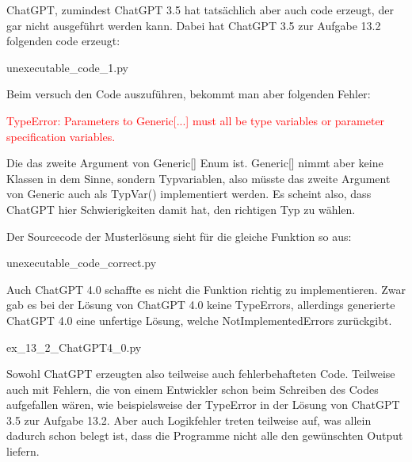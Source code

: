 \documentclass[class=scrbook, crop=false]{standalone}
\begin{document}
    ChatGPT, zumindest ChatGPT 3.5 hat tatsächlich aber auch code erzeugt, der gar nicht ausgeführt werden kann.
    Dabei hat ChatGPT 3.5 zur Aufgabe 13.2 folgenden code erzeugt:
    
    {unexecutable_code_1.py}

    Beim versuch den Code auszuführen, bekommt man aber folgenden Fehler:

    \textcolor{red} {
        TypeError: Parameters to Generic[...] must all be type variables or parameter specification variables.
    }

    Die das zweite Argument von Generic[] Enum ist.
    Generic[] nimmt aber keine Klassen in dem Sinne, sondern Typvariablen, also müsste das zweite Argument von Generic auch als TypVar() implementiert werden.
    Es scheint also, dass ChatGPT hier Schwierigkeiten damit hat, den richtigen Typ zu wählen.

    Der Sourcecode der Musterlösung sieht für die gleiche Funktion so aus:
    
    {unexecutable_code_correct.py}

    Auch ChatGPT 4.0 schaffte es nicht die Funktion richtig zu implementieren.
    Zwar gab es bei der Lösung von ChatGPT 4.0 keine TypeErrors, allerdings generierte ChatGPT 4.0 eine unfertige Lösung, welche
    NotImplementedErrors zurückgibt.
    
    {ex_13_2_ChatGPT4_0.py}

    Sowohl ChatGPT erzeugten also teilweise auch fehlerbehafteten Code.
    Teilweise auch mit Fehlern, die von einem Entwickler schon beim Schreiben des Codes aufgefallen wären, wie beispielsweise
    der TypeError in der Lösung von ChatGPT 3.5 zur Aufgabe 13.2. Aber auch Logikfehler treten teilweise auf, was allein
    dadurch schon belegt ist, dass die Programme nicht alle den gewünschten Output liefern.
\end{document}
